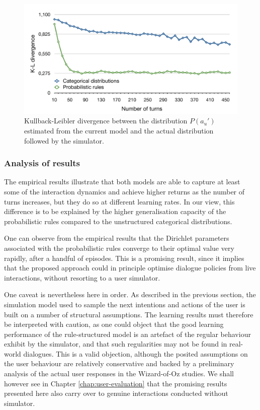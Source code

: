 \begin{figure}[p] 
\begin{center}
\includegraphics[scale=0.42]{imgs/kldivergence.pdf}
\end{center} 
\caption{Kullback-Leibler divergence between the distribution $P(a_u')$ estimated from the current model and the actual distribution followed by the simulator.}
\label{fig:divergence}
\end{figure}

\subsubsection*{Analysis of results}

The empirical results illustrate that both models are able to capture at least some of the interaction dynamics and achieve higher returns as the number of turns increases, but they do so at different learning rates.  In our view, this difference is to be explained by the higher generalisation capacity of the probabilistic rules compared to the unstructured categorical distributions.  

One can observe from the empirical results that the Dirichlet parameters associated with the probabilistic rules converge to their optimal value very rapidly, after a handful of episodes.  This is a promising result, since it implies that the proposed approach could in principle optimise dialogue policies from live interactions, without resorting to a user simulator.

One caveat is nevertheless here in order.  As described in the previous section, the simulation model used to sample the next intentions and actions of the user is built on a number of structural assumptions.  The learning results must therefore be interpreted with caution, as one could object that the good learning performance of the rule-structured model is an artefact of the regular behaviour exhibit by the simulator, and that such regularities may not be found in real-world dialogues. This is a valid objection, although the posited assumptions on the user behaviour are relatively conservative and backed by a preliminary analysis of the actual user responses in the Wizard-of-Oz studies. We shall however see in Chapter \ref{chap:user-evaluation} that the promising results presented here also carry over to genuine interactions conducted without simulator. 


